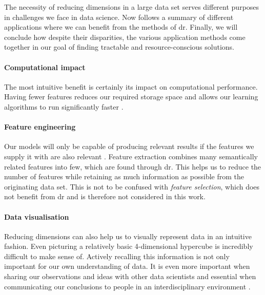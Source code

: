 The necessity of reducing dimensions in a large data set serves different purposes in challenges we face in data science. 
Now follows a summary of different applications where we can benefit from the methods of \acrlong{dr}.
Finally, we will conclude how despite their disparities, the various application methods come together in our goal of finding tractable and resource-conscious solutions.

\paragraph{Computational impact}

The most intuitive benefit is certainly its impact on computational performance.
Having fewer features reduces our required storage space and allows our learning algorithms to run significantly faster \cite{PythonMachineLearningCh1}.
\vspace{-5mm}

\paragraph{Feature engineering}

Our models will only be capable of producing relevant results if the features we supply it with are also relevant \cite{HandsOnMLCh1}.
Feature extraction combines many semantically related features into few, which are found through \gls{dr}.
This helps us to reduce the number of features while retaining as much information as possible from the originating data set.
This is not to be confused with \emph{feature selection}, which does not benefit from \gls{dr} and is therefore not considered in this work.
\vspace{-5mm}

\paragraph{Data visualisation}

Reducing dimensions can also help us to visually represent data in an intuitive fashion.
Even picturing a relatively basic 4-dimensional \gls{hypercube} is incredibly difficult to make sense of.
Actively recalling this information is not only important for our own understanding of data. It is even more important when sharing our observations and ideas with other data scientists and essential when communicating our conclusions to people in an interdisciplinary environment \cite{PythonMachineLearningCh5}.
\vspace{-5mm}

